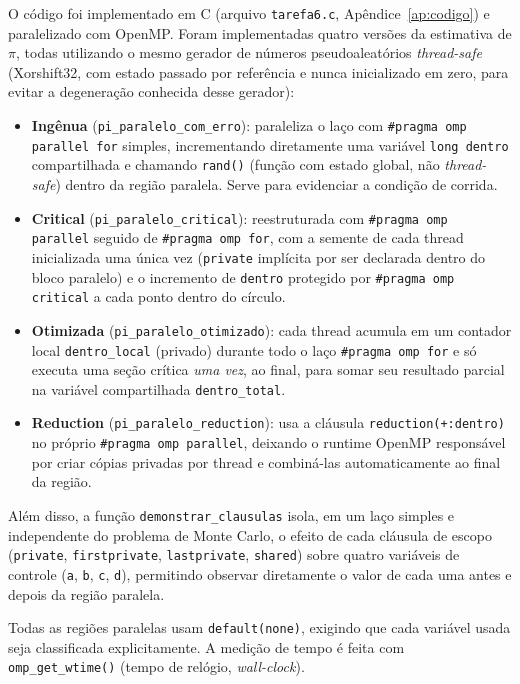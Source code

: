 \documentclass[a4paper,12pt]{article}
\begin{document}
O código foi implementado em C (arquivo \texttt{tarefa6.c}, Apêndice~\ref{ap:codigo}) e paralelizado com OpenMP. Foram implementadas quatro versões da estimativa de $\pi$, todas utilizando o mesmo gerador de números pseudoaleatórios \emph{thread-safe} (Xorshift32, com estado passado por referência e nunca inicializado em zero, para evitar a degeneração conhecida desse gerador):

\begin{itemize}
    \item \textbf{Ingênua} (\texttt{pi\_paralelo\_com\_erro}): paraleliza o laço com \texttt{\#pragma omp parallel for} simples, incrementando diretamente uma variável \texttt{long dentro} compartilhada e chamando \texttt{rand()} (função com estado global, não \emph{thread-safe}) dentro da região paralela. Serve para evidenciar a condição de corrida.
    \item \textbf{Critical} (\texttt{pi\_paralelo\_critical}): reestruturada com \texttt{\#pragma omp parallel} seguido de \texttt{\#pragma omp for}, com a semente de cada thread inicializada uma única vez (\texttt{private} implícita por ser declarada dentro do bloco paralelo) e o incremento de \texttt{dentro} protegido por \texttt{\#pragma omp critical} a cada ponto dentro do círculo.
    \item \textbf{Otimizada} (\texttt{pi\_paralelo\_otimizado}): cada thread acumula em um contador local \texttt{dentro\_local} (privado) durante todo o laço \texttt{\#pragma omp for} e só executa uma seção crítica \emph{uma vez}, ao final, para somar seu resultado parcial na variável compartilhada \texttt{dentro\_total}.
    \item \textbf{Reduction} (\texttt{pi\_paralelo\_reduction}): usa a cláusula \texttt{reduction(+:dentro)} no próprio \texttt{\#pragma omp parallel}, deixando o runtime OpenMP responsável por criar cópias privadas por thread e combiná-las automaticamente ao final da região.
\end{itemize}

Além disso, a função \texttt{demonstrar\_clausulas} isola, em um laço simples e independente do problema de Monte Carlo, o efeito de cada cláusula de escopo (\texttt{private}, \texttt{firstprivate}, \texttt{lastprivate}, \texttt{shared}) sobre quatro variáveis de controle (\texttt{a}, \texttt{b}, \texttt{c}, \texttt{d}), permitindo observar diretamente o valor de cada uma antes e depois da região paralela.

Todas as regiões paralelas usam \texttt{default(none)}, exigindo que cada variável usada seja classificada explicitamente. 
A medição de tempo é feita com \texttt{omp\_get\_wtime()} (tempo de relógio, \emph{wall-clock}).
\end{document}
